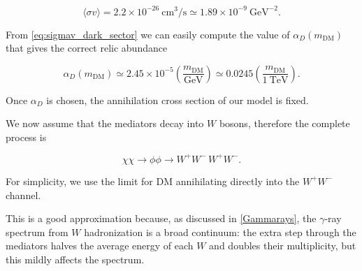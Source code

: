 \begin{equation}
  \langle\sigma v\rangle =  2.2\times10^{-26}~\mathrm{cm^3/s}
    \simeq
    1.89\times10^{-9}~\mathrm{GeV}^{-2}.
\end{equation}

From \cref{eq:sigmav_dark_sector} we can easily compute the value of $\alpha_D(m_{\mathrm{DM}})$ that gives the correct relic abundance

\begin{equation}
\label{eq:alphaD_solution}
\alpha_D(m_{\mathrm{DM}})
\simeq
2.45\times10^{-5}
\left(
\frac{m_{\mathrm{DM}}}{\mathrm{GeV}}
\right)
\simeq
0.0245
\left(
\frac{m_{\mathrm{DM}}}{1~\mathrm{TeV}}
\right).
\end{equation}

Once \(\alpha_D\) is chosen, the annihilation cross section of our model is fixed.

We now assume that the mediators decay into $W$ bosons, therefore the complete process is 

\begin{equation}
    \chi\chi\to\phi\phi\to W^{+}W^{-}\,W^{+}W^{-} .
\end{equation}


For simplicity, we use the limit for DM annihilating directly into the $W^{+}W^{-}$ channel. 

This is a good approximation because, as discussed in \cref{Gammarays}, the $\gamma$-ray spectrum from $W$ 
hadronization is a broad continuum: the extra step through the mediators halves the average energy of each $W$ and 
doubles their multiplicity, but this mildly affects the spectrum.


